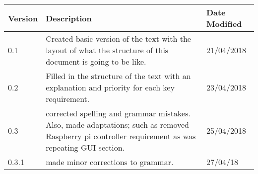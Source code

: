 \documentclass{article}
\begin{document}
\begin{center}

\begin{tabular}{| l | p{8cm} | p{3cm}|}

\hline

\textbf{Version} & \textbf{Description} & \textbf{Date Modified} \\\hline

0.1 & Created basic version of the text with the layout of what the structure of this document is going to be like. & 21/04/2018 \\ \hline
0.2 & Filled in the structure of the text with an explanation and priority for each key requirement. & 23/04/2018 \\ \hline
0.3 & corrected spelling and grammar mistakes. Also, made adaptations; such as removed Raspberry pi controller requirement as was repeating GUI section. & 25/04/2018\\ \hline
0.3.1 & made minor corrections to grammar. & 27/04/18 \\ \hline


\end{tabular}

\end{center}

 
\end{document}
